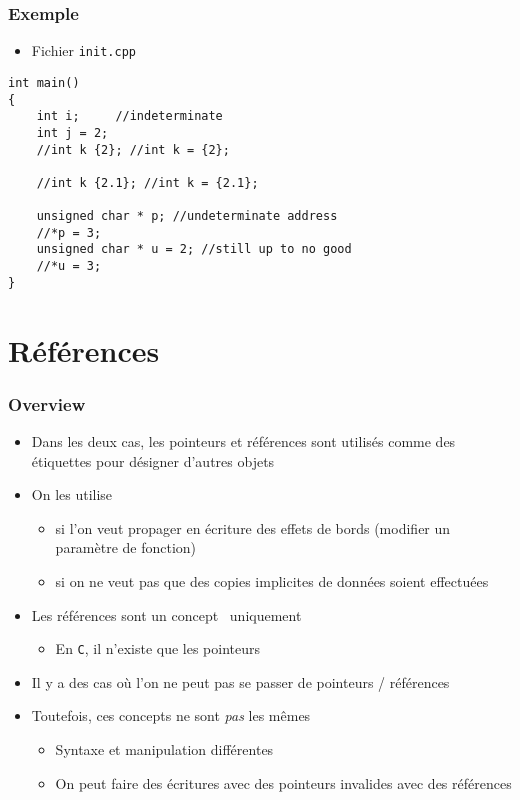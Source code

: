 \begin{frame}[containsverbatim]
\frametitle{Exemple}
\begin{itemize}
\item Fichier \texttt{init.cpp}
\end{itemize}
\begin{lstlisting}
int main()
{
    int i;     //indeterminate
    int j = 2;
    //int k {2}; //int k = {2};
    
    //int k {2.1}; //int k = {2.1};
    
    unsigned char * p; //undeterminate address
    //*p = 3; 
    unsigned char * u = 2; //still up to no good
    //*u = 3;
}
\end{lstlisting}
\end{frame}

\section{Références}

\begin{frame}
\frametitle{Overview}
\begin{itemize}[<+->]
\item Dans les deux cas, les pointeurs et références sont utilisés comme des étiquettes pour désigner d'autres objets
\item On les utilise 
	\begin{itemize}
	\item si l'on veut propager en écriture des effets de bords (modifier un paramètre de fonction)
	\item si on ne veut pas que des copies implicites de données soient effectuées
	\end{itemize}
\item Les références sont un concept \cpp\ uniquement
	\begin{itemize}
	\item En \texttt{C}, il n'existe que les pointeurs
	\end{itemize}
\item Il y a des cas où l'on ne peut pas se passer de pointeurs / références
\item Toutefois, ces concepts ne sont \emph{pas} les mêmes
	\begin{itemize}
	\item Syntaxe et manipulation différentes
	\item On peut faire des écritures avec des pointeurs invalides avec des références
	\end{itemize}
\end{itemize}
\end{frame}

